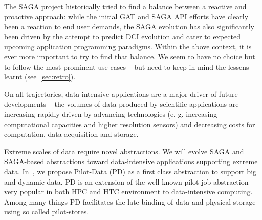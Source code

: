 \documentclass[]{article}
\newcommand{\I}[1]{\textit{#1}}
\begin{document}
 The SAGA project historically tried to find a balance between a
 reactive and proactive approach: while the initial GAT and SAGA API
 efforts have clearly been a reaction to end user demands, the SAGA
 evolution has also significantly been driven by the attempt to
 predict DCI evolution and cater to expected upcoming application
 programming paradigms.  
 Within the above context, it is ever more important to try to find
 that balance.  We seem to have no choice but to follow the most
 prominent use cases -- but need to keep in mind the lessens learnt
 (see~\ref{sec:retro}).
 

 On all trajectories, data-intensive applications are a major driver
 of future developments -- the volumes of data produced by scientific
 applications are increasing rapidly driven by advancing technologies
 (e. g. increasing computational capacities and higher resolution
 sensors) and decreasing costs for computation, data acquisition and
 storage.

 Extreme scales of data require novel abstractions. We will evolve
 SAGA and SAGA-based abstractions toward data-intensive applications
 supporting extreme data.  In~\cite{troy-2011}, we propose Pilot-Data
 (PD) as a first class abstraction to support big and dynamic data. PD
 is an extension of the well-known pilot-job abstraction very popular
 in both HPC and HTC environment to data-intensive computing.  Among
 many things PD facilitates the late binding of data and physical
 storage using so called pilot-stores.
\end{document}
